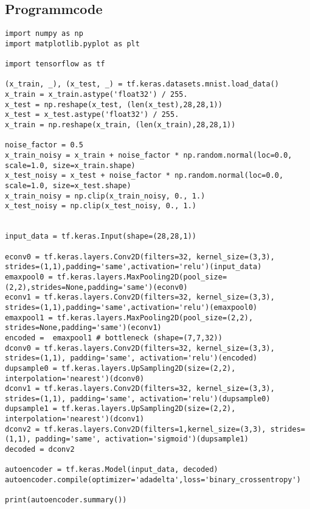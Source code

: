 \begin{appendices}
\chapter{Programmcode}

\begin{verbatim}
import numpy as np
import matplotlib.pyplot as plt

import tensorflow as tf

(x_train, _), (x_test, _) = tf.keras.datasets.mnist.load_data()
x_train = x_train.astype('float32') / 255.
x_test = np.reshape(x_test, (len(x_test),28,28,1))
x_test = x_test.astype('float32') / 255.
x_train = np.reshape(x_train, (len(x_train),28,28,1))

noise_factor = 0.5
x_train_noisy = x_train + noise_factor * np.random.normal(loc=0.0, scale=1.0, size=x_train.shape)
x_test_noisy = x_test + noise_factor * np.random.normal(loc=0.0, scale=1.0, size=x_test.shape)
x_train_noisy = np.clip(x_train_noisy, 0., 1.)
x_test_noisy = np.clip(x_test_noisy, 0., 1.)


input_data = tf.keras.Input(shape=(28,28,1))

econv0 = tf.keras.layers.Conv2D(filters=32, kernel_size=(3,3), strides=(1,1),padding='same',activation='relu')(input_data)
emaxpool0 = tf.keras.layers.MaxPooling2D(pool_size=(2,2),strides=None,padding='same')(econv0)
econv1 = tf.keras.layers.Conv2D(filters=32, kernel_size=(3,3), strides=(1,1),padding='same',activation='relu')(emaxpool0)
emaxpool1 = tf.keras.layers.MaxPooling2D(pool_size=(2,2), strides=None,padding='same')(econv1)
encoded =  emaxpool1 # bottleneck (shape=(7,7,32))
dconv0 = tf.keras.layers.Conv2D(filters=32, kernel_size=(3,3), strides=(1,1), padding='same', activation='relu')(encoded)
dupsample0 = tf.keras.layers.UpSampling2D(size=(2,2), interpolation='nearest')(dconv0)
dconv1 = tf.keras.layers.Conv2D(filters=32, kernel_size=(3,3), strides=(1,1), padding='same', activation='relu')(dupsample0)
dupsample1 = tf.keras.layers.UpSampling2D(size=(2,2), interpolation='nearest')(dconv1)
dconv2 = tf.keras.layers.Conv2D(filters=1,kernel_size=(3,3), strides=(1,1), padding='same', activation='sigmoid')(dupsample1)
decoded = dconv2

autoencoder = tf.keras.Model(input_data, decoded)
autoencoder.compile(optimizer='adadelta',loss='binary_crossentropy')

print(autoencoder.summary())



\end{verbatim}
\end{appendices}

